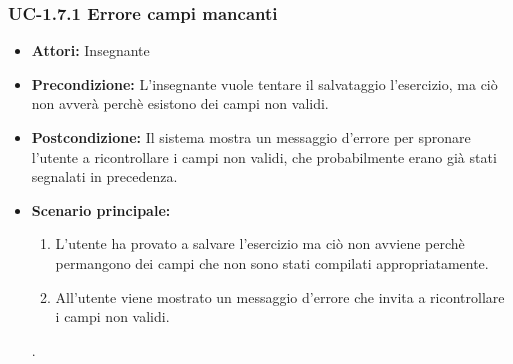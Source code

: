 \subsubsection{UC-1.7.1 Errore campi mancanti}
\begin{itemize}
\item \textbf{Attori: }Insegnante

\item \textbf{Precondizione: }L'insegnante vuole tentare il salvataggio l'esercizio, ma ciò non avverà perchè esistono dei campi non validi.
\item \textbf{Postcondizione: }Il sistema mostra un messaggio d'errore per spronare l'utente a ricontrollare i campi non validi, che probabilmente erano già stati segnalati in precedenza.
\item \textbf{Scenario principale: }
		\begin{enumerate}
		\item L'utente ha provato a salvare l'esercizio ma ciò non avviene perchè permangono dei campi che non sono stati compilati appropriatamente.
		\item All'utente viene mostrato un messaggio d'errore che invita a ricontrollare i campi non validi.
		\end{enumerate}.
\end{itemize}
\newpage
